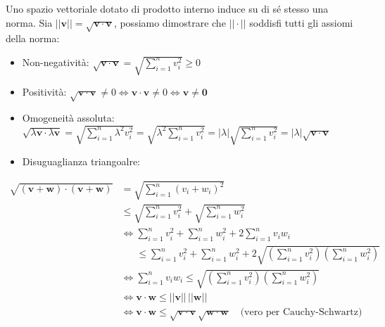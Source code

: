    \vspace{5pt}
    Uno spazio vettoriale dotato di prodotto interno induce su di sé stesso una norma. Sia $||\mathbf{v}|| = \sqrt{\mathbf{v} \cdot \mathbf{v}}$, possiamo dimostrare che $||\cdot||$ soddisfi tutti gli assiomi della norma:
    \begin{itemize}
        \item Non-negatività: $\sqrt{\mathbf{v} \cdot \mathbf{v}} = \sqrt{\displaystyle\sum_{i = 1}^{n} v_i^{2}} \geq 0$
        \item Positività: $\sqrt{\mathbf{v} \cdot \mathbf{v}} \neq 0 \iff \mathbf{v} \cdot \mathbf{v} \neq 0 \iff \mathbf{v} \neq \mathbf{0}$
        \item Omogeneità assoluta: $\sqrt{\lambda\mathbf{v} \cdot \lambda\mathbf{v}} = \sqrt{\displaystyle\sum_{i = 1}^{n} \lambda^2v_i^{2}} = \sqrt{\lambda^2\displaystyle\sum_{i = 1}^{n} v_i^{2}} = |\lambda|\sqrt{\displaystyle\sum_{i = 1}^{n} v_i^{2}} = |\lambda|\sqrt{\mathbf{v} \cdot \mathbf{v}}$
        \item Disuguaglianza triangoalre:
    \end{itemize}
    \[
        \begin{aligned}
            \sqrt{(\mathbf{v} + \mathbf{w}) \cdot (\mathbf{v} + \mathbf{w})}
                &= \sqrt{\sum_{i = 1}^{n} (v_i + w_i)^{2}} \\
                &\leq \sqrt{\sum_{i = 1}^{n} v_i^{2}}
                    + \sqrt{\sum_{i = 1}^{n} w_i^{2}} \\
                &\iff \sum_{i = 1}^{n} v_i^{2} + \sum_{i = 1}^{n} w_i^{2}
                    + 2\sum_{i = 1}^{n} v_i w_i \\
                &\phantom{\iff {}}\leq
                    \sum_{i = 1}^{n} v_i^{2} + \sum_{i = 1}^{n} w_i^{2}
                    + 2\sqrt{\left(\sum_{i = 1}^{n} v_i^{2}\right)
                    \left(\sum_{i = 1}^{n} w_i^{2}\right)} \\
                &\iff \sum_{i = 1}^{n} v_i w_i
                    \leq \sqrt{\left(\sum_{i = 1}^{n} v_i^{2}\right)
                    \left(\sum_{i = 1}^{n} w_i^{2}\right)} \\
                &\iff \mathbf{v} \cdot \mathbf{w}
                    \leq ||\mathbf{v}||\,||\mathbf{w}|| \\
                &\iff \mathbf{v} \cdot \mathbf{w}
                    \leq \sqrt{\mathbf{v} \cdot \mathbf{v}}
                    \sqrt{\mathbf{w} \cdot \mathbf{w}}
                    \quad \text{(vero per Cauchy-Schwartz)}
        \end{aligned}
    \]

